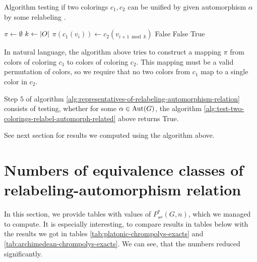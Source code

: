 \begin{algorithm}[H]
    \caption{Algorithm testing if two colorings $c_1, c_2$ can be unified by given automorphism $\alpha$ by some relabeling \pi.} 
    \begin{algorithmic}[1]
            \State $\pi \gets \emptyset$
                \State $k \gets \left|{O}\right|$
                            \State $\pi(c_1(v_i)) \gets c_2(v_{i + 1 \bmod k})$
                        \Else
                            \State \Return False
                        \EndIf
                    \Else
                            \State \Return False
                        \EndIf
                    \EndIf
                \EndFor
            \EndFor
            \State \Return True
        \EndFunction
    \end{algorithmic}
    \label{alg:test-two-colorings-relabel-automorph-related}
\end{algorithm}

In natural language, the algorithm above tries to construct a mapping $\pi$ from colors of coloring $c_1$ to colors of coloring $c_2$. This mapping must be a valid permutation of colors, so we require that no two colors from $c_1$ map to a single color in $c_2$.

Step $5$ of algorithm \ref{alg:representatives-of-relabeling-automorphism-relation} consists of testing, whether for some $\alpha \in \operatorname{Aut}(G)$, the algorithm \ref{alg:test-two-colorings-relabel-automorph-related} above returns True.

See next section for results we computed using the algorithm above.

\section{Numbers of equivalence classes of relabeling-automorphism relation}\label{sec:nums-equiv-classes-relaut}

In this section, we provide tables with values of $P^*_\rightleftharpoons(G,n)$, which we managed to compute. It is especially interesting, to compare results in tables below with the results we got in tables \ref{tab:platonic-chrompolys-exacts} and \ref{tab:archimedean-chrompolys-exacts}. We can see, that the numbers reduced significantly.

